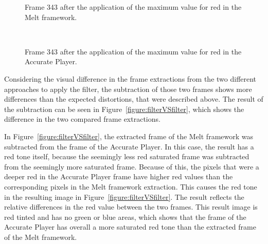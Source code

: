\documentclass[../MasterThesis.tex]{subfiles}
\begin{document}
\begin{minipage}{0.48\textwidth}
	
	\begin{figure}[H]
		\begin{center}
			\caption[Frame 343 after the application of the red filter in the Melt framework.]{Frame 343 after the application of the maximum value for red in the Melt framework.}
			\label{figure:redMelt}
		\end{center}
	\end{figure}
\end{minipage}\begin{minipage}{0.04\textwidth}
	\ 
\end{minipage}\begin{minipage}{0.48\textwidth}
	
	\begin{figure}[H]
		\begin{center}
			\caption[Frame 343 after the application of the red filter in the Accurate Player.]{Frame 343 after the application of the maximum value for red in the Accurate Player.}
			\label{figure:redAP}
		\end{center}
	\end{figure}
\end{minipage}

\vspace*{2em}
Considering the visual difference in the frame extractions from the two different approaches to apply the filter, the subtraction of those two frames shows more differences than the expected distortions, that were described above. The result of the subtraction can be seen in Figure~\ref{figure:filterVSfilter}, which shows the difference in the two compared frame extractions.

In Figure~\ref{figure:filterVSfilter}, the extracted frame of the Melt framework was subtracted from the frame of the Accurate Player.
In this case, the result has a red tone itself, because the seemingly less red saturated frame was subtracted from the seemingly more saturated frame. Because of this, the pixels that were a deeper red in the Accurate Player frame have higher red values than the corresponding pixels in the Melt framework extraction. This causes the red tone in the resulting image in Figure~\ref{figure:filterVSfilter}.
The result reflects the relative differences in the red value between the two frames. This result image is red tinted and has no green or blue areas, which shows that the frame of the Accurate Player has overall a more saturated red tone than the extracted frame of the Melt framework.
\end{document}
